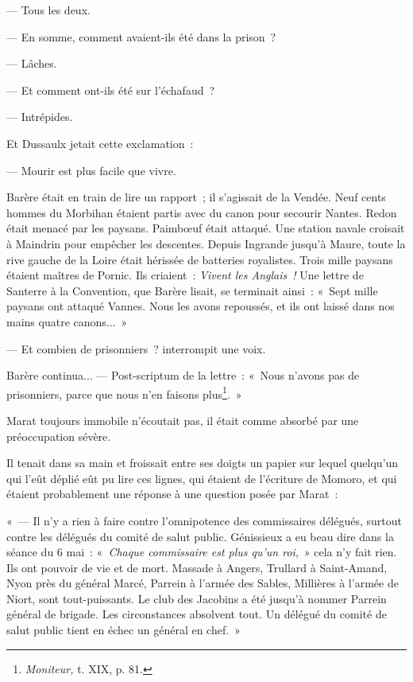 \documentclass[french,twoside]{book} %
\begin{document}
— Tous les deux.\par
 — En somme, comment avaient-ils été dans la prison ?\par
— Lâches.\par
— Et comment ont-ils été sur l’échafaud ?\par
— Intrépides.\par
Et Dussaulx jetait cette exclamation :\par
— Mourir est plus facile que vivre.\par
Barère était en train de lire un rapport ; il s’agissait de la Vendée. Neuf cents hommes du Morbihan étaient partis avec du canon pour secourir Nantes. Redon était menacé par les paysans. Paimbœuf était attaqué. Une station navale croisait à Maindrin pour empêcher les descentes. Depuis Ingrande jusqu’à Maure, toute la rive gauche de la Loire était hérissée de batteries royalistes. Trois mille paysans étaient maîtres de Pornic. Ils criaient : \emph{Vivent les Anglais !} Une lettre de Santerre à la Convention, que Barère lisait, se terminait ainsi : « Sept mille paysans ont attaqué Vannes. Nous les avons repoussés, et ils ont laissé dans nos mains quatre canons... »\par
— Et combien de prisonniers ? interrompit une voix.\par
Barère continua... — Post-scriptum de la lettre : « Nous n’avons pas de prisonniers, parce que nous n’en faisons plus\footnote{ \noindent \emph{Moniteur,} t. XIX, p. 81.
 }. »\par
Marat toujours immobile n’écoutait pas, il était comme absorbé par une préoccupation sévère.\par
Il tenait dans sa main et froissait entre ses doigts  un papier sur lequel quelqu’un qui l’eût déplié eût pu lire ces lignes, qui étaient de l’écriture de Momoro, et qui étaient probablement une réponse à une question posée par Marat :\par
« — Il n’y a rien à faire contre l’omnipotence des commissaires délégués, surtout contre les délégués du comité de salut public. Génissieux a eu beau dire dans la séance du 6 mai : « \emph{Chaque commissaire est plus qu’un roi}, » cela n’y fait rien. Ils ont pouvoir de vie et de mort. Massade à Angers, Trullard à Saint-Amand, Nyon près du général Marcé, Parrein à l’armée des Sables, Millières à l’armée de Niort, sont tout-puissants. Le club des Jacobins a été jusqu’à nommer Parrein général de brigade. Les circonstances absolvent tout. Un délégué du comité de salut public tient en échec un général en chef. »\par
\end{document}
